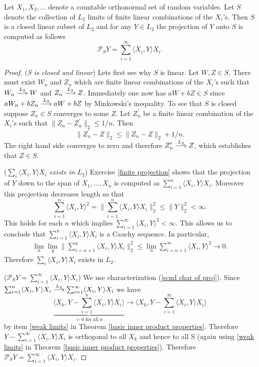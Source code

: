 \begin{theorem} \label{computing projections}
Let $X_1, X_2, \ldots $ denote a countable orthonormal set of random variables. Let $S$ denote the collection of $L_2$ limits of finite linear combinations of the $X_i$'s. Then $S$ is a closed linear subset of $L_2$ and for any $Y\in L_2$ the projection of $Y$ onto $S$ is computed as follows
\[
\mathcal P_S Y = \sum_{i=1}^\infty \langle X_i, Y\rangle X_i.
\]
\end{theorem}
\begin{proof}
({\sl S is closed and linear}) Lets first see why $S$ is linear. Let $W, Z \in S$. There must exist $W_n$ and $Z_n$ which are finite linear combinations of the $X_i$'s such that  $W_n \overset{\small L_2} \longrightarrow W$ and $Z_n\overset{\small L_2} \longrightarrow Z$. Immediately one now has $aW + bZ\in S$ since  $aW_n + bZ_n \overset{\small L_2} \longrightarrow aW + bZ$  by Minkowski’s inequality. To see that $S$ is closed suppose $Z_n\in S$ converges to some $Z$. Let $Z^\prime_n$ be a finite linear combination of the $X_i$'s such that $\|Z_n - Z^\prime_n \|_2\leq 1/n$. Then
\[ \|Z_n^\prime - Z \|_2 \leq \|Z_n - Z \|_2 + 1/n. \]
The right hand side converges to zero and therefore $Z_n^\prime \overset{\small L_2} \longrightarrow Z$, which establishes that $Z\in S$.


({\sl $\sum_{i} \langle X_i, Y\rangle X_i$ exists in $L_2$}) Exercise \ref{finite projection} shows that the projection of $Y$ down to the span of $X_1, \ldots, X_n$ is computed as $\sum_{i=1}^n \langle X_i, Y \rangle X_i$. Moreover this projection decreases length so that
\[ \textstyle\sum_{i=1}^n \langle X_i, Y \rangle^2 = \bigl\| \textstyle\sum_{i=1}^n \langle X_i, Y \rangle X_i\bigl\|_2^2\leq \| Y \|_2^2<\infty. \]
This holds for each $n$ which implies $\sum_{i=1}^\infty \langle X_i, Y \rangle^2 <\infty$. This allows us to conclude that $\sum_{i=1}^n \langle X_i, Y\rangle X_i$ is a Cauchy sequence. In particular,
\begin{align*}
\lim_{n}\lim_q\bigl\|{\textstyle\sum_{i=n+1}^q} \langle X_i, Y\rangle X_i \bigr\|_2^2 \leq \lim_{n} \textstyle\sum_{i=n+1}^\infty \langle X_i, Y \rangle^2\rightarrow 0.
\end{align*}
Therefore $\sum_{i} \langle X_i, Y\rangle X_i$ exists in $L_2$.

({\sl $\mathcal P_S Y = \sum_{i=1}^\infty  \langle X_i, Y\rangle X_i$}) We use characterization (\ref{scnd char of proj}). Since $\sum_{i=1}^n \langle X_i, Y\rangle X_i\overset{\small L_2} \longrightarrow \sum_{i=1}^\infty \langle X_i, Y\rangle X_i$ we have
\[ \underbrace{\bigl\langle X_k, Y - \textstyle\sum_{i=1}^n \langle X_i, Y\rangle X_i \bigl\rangle}_{\text{$=0$ for all $n$}} \rightarrow  \bigl\langle X_k,Y - \textstyle\sum_{i=1}^\infty \langle X_i, Y\rangle X_i\bigr\rangle \]
by item \ref{weak limits} in Theorem \ref{basic inner product properties}. Therefore $Y - \sum_{i=1}^\infty \langle X_i, Y\rangle X_i$ is orthogonal to all $X_k$ and hence to all S (again using \ref{weak limits} in Theorem \ref{basic inner product properties}). Therefore $\mathcal P_S Y = \sum_{i=1}^\infty \langle X_i, Y\rangle X_i$.
\end{proof}


